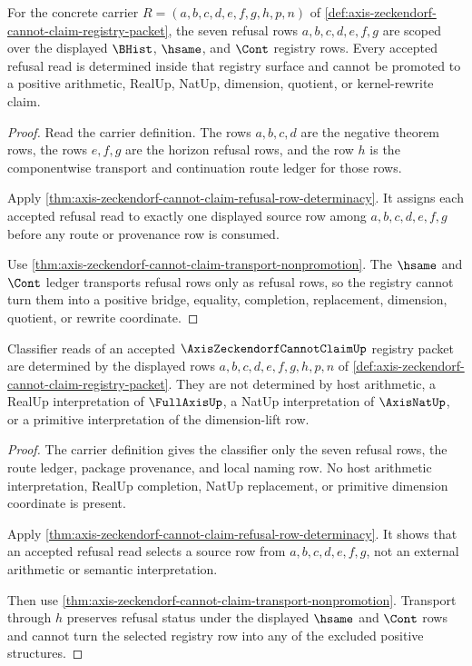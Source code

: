 \begin{theorem}
\label{thm:axis-zeckendorf-refusal-kernel-scope}
For the concrete carrier $R=(a,b,c,d,e,f,g,h,p,n)$ of \autoref{def:axis-zeckendorf-cannot-claim-registry-packet}, the seven refusal rows $a,b,c,d,e,f,g$ are scoped over the displayed $\BHist$, $\hsame$, and $\Cont$ registry rows. Every accepted refusal read is determined inside that registry surface and cannot be promoted to a positive arithmetic, RealUp, NatUp, dimension, quotient, or kernel-rewrite claim.
\end{theorem}
\begin{proof}
Read the carrier definition. The rows $a,b,c,d$ are the negative theorem rows, the rows $e,f,g$ are the horizon refusal rows, and the row $h$ is the componentwise transport and continuation route ledger for those rows.

Apply \autoref{thm:axis-zeckendorf-cannot-claim-refusal-row-determinacy}. It assigns each accepted refusal read to exactly one displayed source row among $a,b,c,d,e,f,g$ before any route or provenance row is consumed.

Use \autoref{thm:axis-zeckendorf-cannot-claim-transport-nonpromotion}. The $\hsame$ and $\Cont$ ledger transports refusal rows only as refusal rows, so the registry cannot turn them into a positive bridge, equality, completion, replacement, dimension, quotient, or rewrite coordinate.
\end{proof}

\begin{theorem}
\label{thm:axis-zeckendorf-registry-classifier-scope}
Classifier reads of an accepted $\AxisZeckendorfCannotClaimUp$ registry packet are determined by the displayed rows $a,b,c,d,e,f,g,h,p,n$ of \autoref{def:axis-zeckendorf-cannot-claim-registry-packet}. They are not determined by host arithmetic, a RealUp interpretation of $\FullAxisUp$, a NatUp interpretation of $\AxisNatUp$, or a primitive interpretation of the dimension-lift row.
\end{theorem}
\begin{proof}
The carrier definition gives the classifier only the seven refusal rows, the route ledger, package provenance, and local naming row. No host arithmetic interpretation, RealUp completion, NatUp replacement, or primitive dimension coordinate is present.

Apply \autoref{thm:axis-zeckendorf-cannot-claim-refusal-row-determinacy}. It shows that an accepted refusal read selects a source row from $a,b,c,d,e,f,g$, not an external arithmetic or semantic interpretation.

Then use \autoref{thm:axis-zeckendorf-cannot-claim-transport-nonpromotion}. Transport through $h$ preserves refusal status under the displayed $\hsame$ and $\Cont$ rows and cannot turn the selected registry row into any of the excluded positive structures.
\end{proof}

